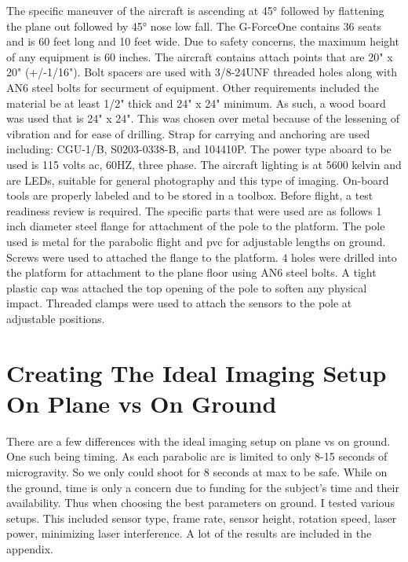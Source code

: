 The specific maneuver of the aircraft is ascending at \ang{45} followed by flattening the plane out followed by \ang{45} nose low fall. The G-ForceOne contains 36 seats and is 60 feet long and 10 feet wide. Due to safety concerns, the maximum height of any equipment is 60 inches. The aircraft contains attach points that are 20" x 20" (+/-1/16"). Bolt spacers are used with 3/8-24UNF threaded holes along with AN6 steel bolts for securment of equipment. Other requirements included the material be at least 1/2" thick and 24" x 24" minimum. As such, a wood board was used that is 24" x 24". This was chosen over metal because of the lessening of vibration and for ease of drilling. Strap for carrying and anchoring are used including: CGU-1/B, S0203-0338-B, and 104410P. The power type aboard to be used is 115 volts ac, 60HZ, three phase. The aircraft lighting is at 5600 kelvin and are LEDs, suitable for general photography and this type of imaging. On-board tools are properly labeled and to be stored in a toolbox. Before flight, a test readiness review is required.
The specific parts that were used are as follows 1 inch diameter steel flange for attachment of the pole to the platform. The pole used is metal for the parabolic flight and pvc for adjustable lengths on ground. Screws were used to attached the flange to the platform. 4 holes were drilled into the platform for attachment to the plane floor using AN6 steel bolts. A tight plastic cap was attached the top opening of the pole to soften any physical impact. Threaded clamps were used to attach the sensors to the pole at adjustable positions.

\section{Creating The Ideal Imaging Setup On Plane vs On Ground}
There are a few differences with the ideal imaging setup on plane vs on ground. One such being timing. As each parabolic arc is limited to only 8-15 seconds of microgravity. So we only could shoot for 8 seconds at max to be safe. While on the ground, time is only a concern due to funding for the subject's time and their availability. Thus when choosing the best parameters on ground. I tested various setups. This included sensor type, frame rate, sensor height, rotation speed, laser power, minimizing laser interference. A lot of the results are included in the appendix.
